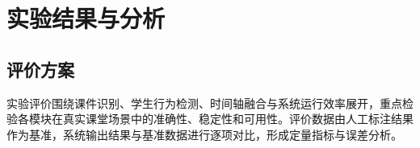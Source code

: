 \documentclass[12pt,hyperref,a4paper,UTF8]{ctexart}
\begin{document}






\section{实验结果与分析}
\subsection{评价方案}

实验评价围绕课件识别、学生行为检测、时间轴融合与系统运行效率展开，重点检验各模块在真实课堂场景中的准确性、稳定性和可用性。评价数据由人工标注结果作为基准，系统输出结果与基准数据进行逐项对比，形成定量指标与误差分析。
\end{document}
